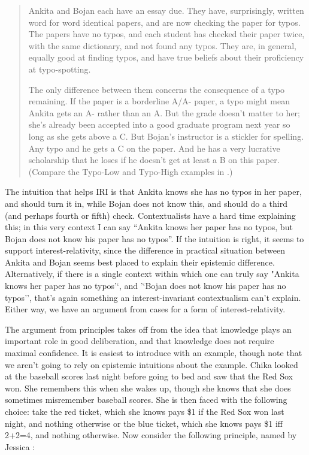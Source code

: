 \documentclass[11pt,oneside]{book}
\begin{document}
\begin{quote}

Ankita and Bojan each have an essay due. They have, surprisingly, written word for word identical papers, and are now checking the paper for typos. The papers have no typos, and each student has checked their paper twice, with the same dictionary, and not found any typos. They are, in general, equally good at finding typos, and have true beliefs about their proficiency at typo-spotting. 

The only difference between them concerns the consequence of a typo remaining. If the paper is a borderline A\slash A- paper, a typo might mean Ankita gets an A- rather than an A. But the grade doesn't matter to her; she's already been accepted into a good graduate program next year so long as she gets above a C. But Bojan's instructor is a stickler for spelling. Any typo and he gets a C on the paper. And he has a very lucrative scholarship that he loses if he doesn't get at least a B on this paper. (Compare the Typo-Low and Typo-High examples in  \citet[199]{Pinillos2012}.)
\end{quote}
The intuition that helps IRI is that Ankita knows she has no typos in her paper, and should turn it in, while Bojan does not know this, and should do a third (and perhaps fourth or fifth) check. Contextualists have a hard time explaining this; in this very context I can say ``Ankita knows her paper has no typos, but Bojan does not know his paper has no typos''. If the intuition is right, it seems to support interest-relativity, since the difference in practical situation between Ankita and Bojan seems best placed to explain their epistemic difference. Alternatively, if there is a single context within which one can truly say "Ankita knows her paper has no typos'`, and '`Bojan does not know his paper has no typos'', that's again something an interest-invariant contextualism can't explain. Either way, we have an argument from cases for a form of interest-relativity.

The argument from principles takes off from the idea that knowledge plays an important role in good deliberation, and that knowledge does not require maximal confidence. It is easiest to introduce with an example, though note that we aren't going to rely on epistemic intuitions about the example. Chika looked at the baseball scores last night before going to bed and saw that the Red Sox won. She remembers this when she wakes up, though she knows that she does sometimes misremember baseball scores. She is then faced with the following choice: take the red ticket, which she knows pays \$1 if the Red Sox won last night, and nothing otherwise or the blue ticket, which she knows pays \$1 iff 2+2=4, and nothing otherwise. Now consider the following principle, named by Jessica  \citet{Brown2013}:
\end{document}
